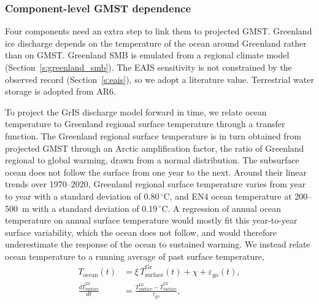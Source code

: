 \documentclass[draft,linenumbers]{agujournal2025}
\begin{document}
\subsubsection{Component-level GMST dependence}
\label{s:gmst_dependence}

Four components need an extra step to link them to projected GMST. Greenland ice discharge depends on the temperature of the ocean around Greenland rather than on GMST. Greenland SMB is emulated from a regional climate model (Section~\ref{s:greenland_smb}). The EAIS sensitivity is not constrained by the observed record (Section~\ref{s:eais}), so we adopt a literature value. Terrestrial water storage is adopted from AR6.

To project the GrIS discharge model forward in time, we relate ocean temperature to Greenland regional surface temperature through a transfer function. The Greenland regional surface temperature is in turn obtained from projected GMST through an Arctic amplification factor, the ratio of Greenland regional to global warming, drawn from a normal distribution. The subsurface ocean does not follow the surface from one year to the next. Around their linear trends over 1970--2020, Greenland regional surface temperature varies from year to year with a standard deviation of 0.80\,$^\circ$C, and EN4 ocean temperature at 200--500~m with a standard deviation of 0.19\,$^\circ$C. A regression of annual ocean temperature on annual surface temperature would mostly fit this year-to-year surface variability, which the ocean does not follow, and would therefore underestimate the response of the ocean to sustained warming. We instead relate ocean temperature to a running average of past surface temperature,
\begin{equation}
	\begin{aligned}
	T_{\mathrm{ocean}}(t) &= \xi\, \overline{T}_{\mathrm{surface}}^{\mathrm{Gr}}(t) + \chi + \varepsilon_{\mathrm{go}}(t), \\
	\frac{d\overline{T}_{\mathrm{surface}}^{\mathrm{Gr}}}{dt} &= \frac{T_{\mathrm{surface}}^{\mathrm{Gr}} - \overline{T}_{\mathrm{surface}}^{\mathrm{Gr}}}{\tau_{\mathrm{go}}},
	\end{aligned}
	\label{eq:ocean_transfer}
\end{equation}
\end{document}
